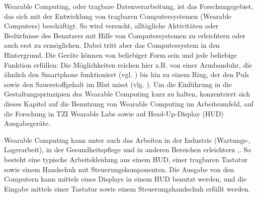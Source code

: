 Wearable Computing, oder tragbare Datenverarbeitung, ist das Forschungsgebiet, das sich mit der Entwicklung von tragbaren Computersystemen (Wearable Computers) beschäftigt\cite{wikiWearable}. So wird versucht, alltägliche Aktivitäten oder Bedürfnisse des Benutzers  mit Hilfe von Computersystemen zu erleichtern oder auch erst zu ermöglichen. Dabei tritt aber das Computersystem in den Hintergrund. Die Geräte können von beliebiger Form sein und jede beliebige Funktion erfüllen: Die Möglichkeiten reichen hier z.B. von einer Armbanduhr, die ähnlich den Smartphone funktioniert (vgl. \cite{zeitPc}) bis hin zu  einem  Ring, der den Puls sowie den Sauerstoffgehalt im Blut misst (vlg. \cite{urhWearable}).  Um die Einführung in die Gestaltungsprinzipien des Wearable Computing kurz zu halten, konzentriert sich dieses Kapitel auf die Benutzung von Wearable Computing im Arbeitsumfeld, auf die Forschung in TZI Wearable Labs sowie auf Head-Up-Display (HUD) Ausgabegeräte.

Wearable Computing kann unter auch das Arbeiten in der Industrie (Wartungs-, Lagerarbeit), in der Gesundheitspflege und in anderen Bereichen erleichtern \cite{Witt:2006hi},\cite{Lawo:2008gg}. So besteht eine typische Arbeitskleidung aus einem HUD, einer tragbaren Tastatur sowie einem Handschuh mit Steuerungskomponenten. Die Ausgabe von den Computern kann mittels eines Displays in einem HUD benutzt werden, und die Eingabe mittels einer Tastatur sowie einem Steuerungshandschuh erfüllt werden. 

